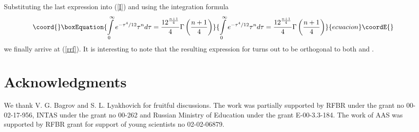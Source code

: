 \documentclass[a4paper,12pt]{article}
\begin{document}
Substituting the last expression into (\ref{I}) and using the
integration formula
\begin{equation}\coord{}\boxEquation{
\int\limits_0^{\infty}e^{-\tau^4/12}\tau^n
d\tau=\frac{12^{\frac{n+1}4}}{4}\Gamma \left( \frac{n+1}4\right)
}{
\int\limits_0^{\infty}e^{-\tau^4/12}\tau^n
d\tau=\frac{12^{\frac{n+1}4}}{4}\Gamma \left( \frac{n+1}4\right)
}{ecuacion}\coordE{}\end{equation}
we finally arrive at (\ref{rrf}). It is interesting to note that
the resulting expression for \coordHE{} turns out to be
orthogonal to both \coordHE{} and \coordHE{}.

\section*{Acknowledgments}

We thank V. G. Bagrov and S. L. Lyakhovich for fruitful
discussions. The work was partially supported by RFBR under the
grant no 00-02-17-956, INTAS under the grant no 00-262 and Russian
Ministry of Education under the grant E-00-3.3-184. The work of
AAS was supported by RFBR grant for support of young scientists
no 02-02-06879.
\end{document}
